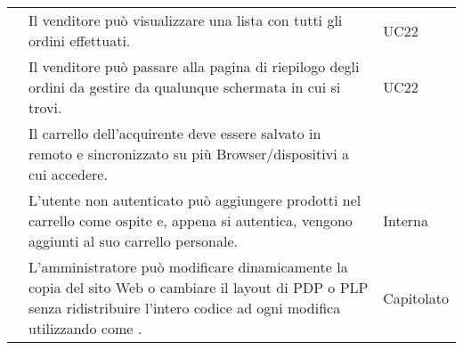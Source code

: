 \begin{longtable}{|c C{9.5cm} C{2.5cm}|}
     & Il venditore può visualizzare una lista con tutti gli ordini effettuati. & UC22 \\
    
     & Il venditore può passare alla pagina di riepilogo degli ordini da gestire da qualunque schermata in cui si trovi. & UC22 \\
    
     & Il carrello dell'acquirente deve essere salvato in remoto e sincronizzato su più Browser/dispositivi a cui accedere. &  \\
    
     & L'utente non autenticato può aggiungere prodotti nel carrello come ospite e, appena si autentica, vengono aggiunti al suo carrello personale. & Interna \\
    
     & L'amministratore può modificare dinamicamente la copia del sito Web o cambiare il layout di PDP o PLP senza ridistribuire l'intero codice ad ogni modifica utilizzando  come . & Capitolato \\

\end{longtable}

   
\begin{comment}
\rfun{O}{6} & La ricerca di prodotti deve essere possibile dalla schermata principale e dalla \glo{PLP}. & 
\end{comment}